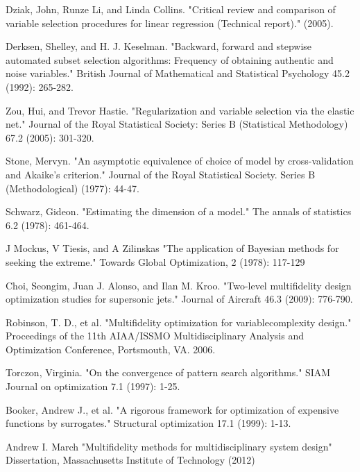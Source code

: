 \documentclass[a4paper,onecolumn]{article}
\theoremstyle{remark}
\begin{document}
\begin{thebibliography}{9}
Dziak, John, Runze Li, and Linda Collins. 
"Critical review and comparison of variable selection procedures for linear regression (Technical report)." (2005).

Derksen, Shelley, and H. J. Keselman. 
"Backward, forward and stepwise automated subset selection algorithms: Frequency of obtaining authentic and noise variables." 
British Journal of Mathematical and Statistical Psychology 45.2 (1992): 265-282.

Zou, Hui, and Trevor Hastie. 
"Regularization and variable selection via the elastic net." 
Journal of the Royal Statistical Society: Series B (Statistical Methodology) 67.2 (2005): 301-320.

Stone, Mervyn. 
"An asymptotic equivalence of choice of model by cross-validation and Akaike's criterion." 
Journal of the Royal Statistical Society. Series B (Methodological) (1977): 44-47.

Schwarz, Gideon. 
"Estimating the dimension of a model." 
The annals of statistics 6.2 (1978): 461-464.

J Mockus, V Tiesis, and A Zilinskas
"The application of Bayesian methods for seeking the extreme."
Towards Global Optimization, 2 (1978): 117-129

Choi, Seongim, Juan J. Alonso, and Ilan M. Kroo. 
"Two-level multifidelity design optimization studies for supersonic jets." 
Journal of Aircraft 46.3 (2009): 776-790.


Robinson, T. D., et al. 
"Multifidelity optimization for variablecomplexity design."
Proceedings of the 11th AIAA/ISSMO Multidisciplinary Analysis and Optimization Conference, 
Portsmouth, VA. 2006.

Torczon, Virginia. 
"On the convergence of pattern search algorithms." 
SIAM Journal on optimization 7.1 (1997): 1-25.

Booker, Andrew J., et al. 
"A rigorous framework for optimization of expensive functions by surrogates." 
Structural optimization 17.1 (1999): 1-13.

Andrew I. March
"Multifidelity methods for multidisciplinary system design"
Dissertation, Massachusetts Institute of Technology (2012)


\end{thebibliography}
\end{document}
